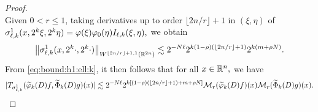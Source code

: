 \begin{proof}
\begin{equation*}
\end{equation*}
Given $0< r \le 1$, taking  derivatives up to order $\lfloor{2n/r}\rfloor + 1$ in $(\xi,\eta)$ of
$\sigma^1_{\ell, k}(x, 2^k \xi, 2^k \eta) = \varphi(\xi) \varphi_0(\eta)  I_{\ell, k}(\xi, \eta),$
 we obtain
\begin{align}\label{eq:estsigkl}
  \left\|\sigma^1_{\ell, k}(x, 2^{k} \cdot, 2^{k} \cdot)\right\|_{W^{\lfloor{2n/r}\rfloor + 1,1}(\mathbb{R}^{2n})} \lesssim 2^{- N \ell} 2^{k (1-\rho)( \lfloor{2n/r}\rfloor + 1)} 2^{k (m+\rho N)}.
\end{align}
From \eqref{eq:bound:h1:ell:k}, it then follows that for all $x\in{{\mathbb R}^n},$ we have
\begin{equation*}
|T_{\sigma^1_{\ell,k}}(\widetilde{\varphi}_k(D)f,\widetilde{\Phi}_k(D)g)(x)|  \lesssim 2^{- N \ell} 2^{k [(1-\rho)( \lfloor{2n/r}\rfloor + 1)+m+\rho N]}    \mathcal{M}_r(\widetilde{\varphi}_k(D)f)(x)\mathcal{M}_r(\widetilde{\Phi}_k(D)g)(x).
\end{equation*}


\end{proof}
